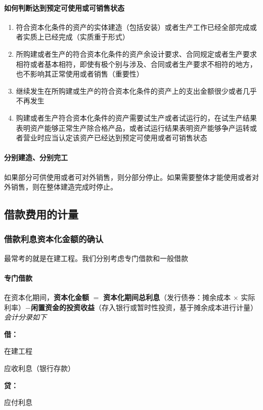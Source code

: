 \documentclass[UTF8,12pt]{ctexart}
\newenvironment{Dr}{%
	\begin{list}{}%
		{
			\setlength{\leftmargin}{2em}
			\setlength{\labelwidth}{2em}
			\setlength{\labelsep}{0pt}
			\setlength{\itemindent}{0pt}
			\setlength{\listparindent}{0pt}
			\setlength{\parsep}{0pt}
			\setlength{\topsep}{0pt}
		}
		\item[\textbf{借：}]
	}{%
	\end{list}
}
\newenvironment{Cr}{%
	\begin{list}{}%
		{
			\setlength{\leftmargin}{2em}
			\setlength{\labelwidth}{2em}
			\setlength{\labelsep}{0pt}
			\setlength{\itemindent}{0pt}
			\setlength{\listparindent}{0pt}
			\setlength{\parsep}{0pt}
			\setlength{\topsep}{0pt}
		}
		\item[\textbf{贷：}]
	}{%
	\end{list}
}
\numberwithin{equation}{section} %
\numberwithin{figure}{section}
\numberwithin{table}{section}
\begin{document}
	\paragraph{如何判断达到预定可使用或可销售状态}
	\begin{enumerate}
		\item 符合资本化条件的资产的实体建造（包括安装）或者生产工作已经全部完成或者实质上已经完成（实质重于形式）
		
		\item 所购建或者生产的符合资本化条件的资产余设计要求、合同规定或者生产要求相符或者基本相符，即使有极个别与涉及、合同或者生产要求不相符的地方，也不影响其正常使用或者销售（重要性）
		
		\item 继续发生在所购建或生产的符合资本化条件的资产上的支出金额很少或者几乎不再发生
		
		\item 购建或者生产符合资本化条件的资产需要试生产或者试运行的，在试生产结果表明资产能够正常生产除合格产品，或者试运行结果表明资产能够争产运转或者营业时应当认定该资产已经达到预定可使用或者可销售状态
	\end{enumerate}
	
	\paragraph{分别建造、分别完工}如果部分可供使用或者可对外销售，则分部分停止。如果需要整体才能使用或者对外销售，则在整体建造完成时停止。
	
	\subsection{借款费用的计量}
	
	\subsubsection{借款利息资本化金额的确认}
	最常考的就是在建工程。我们分别考虑专门借款和一般借款
	
	\paragraph{专门借款}
	在资本化期间，\textbf{资本化金额} $=$ \textbf{资本化期间总利息}（发行债券：摊余成本 $\times$ 实际利率）$-$\textbf{闲置资金的投资收益}（存入银行或暂时性投资，基于摊余成本进行计量）\textit{会计分录如下}
	
	\begin{Dr}
		在建工程
		
		应收利息（银行存款）
	\end{Dr}
	\begin{Cr}
		应付利息
	\end{Cr}
	
\end{document}
